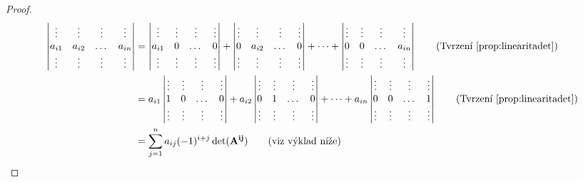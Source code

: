 \begin{proof}
    \begin{align*}
        \begin{vmatrix}
            \vdots &\vdots &\vdots &\vdots \\
            a_{i1} &a_{i2} &\dots &a_{in} \\
            \vdots &\vdots &\vdots &\vdots
        \end{vmatrix}
        &=  
        \begin{vmatrix}
            \vdots &\vdots &\vdots &\vdots \\
            a_{i1} &0 &\dots &0 \\
            \vdots &\vdots &\vdots &\vdots
        \end{vmatrix}
        +
        \begin{vmatrix}
            \vdots &\vdots &\vdots &\vdots \\
            0 &a_{i2} &\dots &0 \\
            \vdots &\vdots &\vdots &\vdots
        \end{vmatrix}
        +
        \dots
        +
        \begin{vmatrix}
            \vdots &\vdots &\vdots &\vdots \\
            0 &0 &\dots &a_{in} \\
            \vdots &\vdots &\vdots &\vdots
        \end{vmatrix}
        \tag{Tvrzení~\ref{prop:linearitadet}} \\
        &= 
        a_{i1}
        \begin{vmatrix}
            \vdots &\vdots &\vdots &\vdots \\
            1 &0 &\dots &0 \\
            \vdots &\vdots &\vdots &\vdots
        \end{vmatrix}
        +
        a_{i2}
        \begin{vmatrix}
            \vdots &\vdots &\vdots &\vdots \\
            0 &1 &\dots &0 \\
            \vdots &\vdots &\vdots &\vdots
        \end{vmatrix}
        +
        \dots
        +
        a_{in}
        \begin{vmatrix}
            \vdots &\vdots &\vdots &\vdots \\
            0 &0 &\dots &1 \\
            \vdots &\vdots &\vdots &\vdots
        \end{vmatrix}
        \tag{Tvrzení~\ref{prop:linearitadet}} \\
        &=
        \sum_{j=1}^n a_{ij}(-1)^{i+j}\det(\mat{A^{ij}}) 
        \tag{viz výklad níže}
    \end{align*}


\end{proof}
